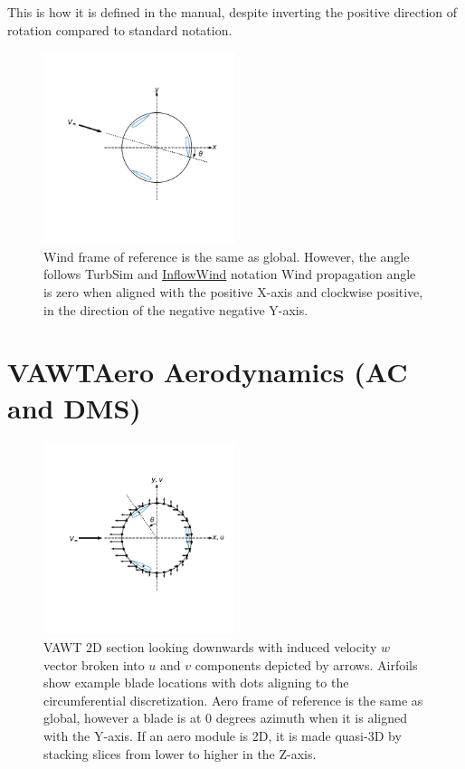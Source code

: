 \documentclass[11pt]{article}
\begin{document}
This is how it is defined in the manual, despite inverting the positive direction of rotation compared to standard notation.

\begin{figure}[H]
\centering
\vspace{-12pt}
\includegraphics[trim={1.3cm 2.4cm .5cm 1.5cm},clip,width=0.5\textwidth]{./figs/inflow_wind}
\vspace{-5pt}
\caption{Wind frame of reference is the same as global.  However, the angle follows TurbSim and \href{https://github.com/old-NWTC/InflowWind}{InflowWind} notation Wind propagation angle is zero when aligned with the positive X-axis and clockwise positive, in the direction of the negative negative Y-axis.}
\label{fig:ac_velocities}
\end{figure}

\section{VAWTAero Aerodynamics (AC and DMS)}

\begin{figure}[H]
\centering
\vspace{-12pt}
\includegraphics[trim={1.3cm 2.4cm .5cm 1.5cm},clip,width=0.5\textwidth]{./figs/vawt_slice}
\vspace{-12pt}
\caption{VAWT 2D section looking downwards with induced velocity \(w\) vector broken into \(u\) and \(v\) components depicted by arrows. Airfoils show example blade locations with dots aligning to the circumferential discretization.  Aero frame of reference is the same as global, however a blade is at 0 degrees azimuth when it is aligned with the Y-axis.  If an aero module is 2D, it is made quasi-3D by stacking slices from lower to higher in the Z-axis.}
\label{fig:ac_velocities}
\end{figure}
\end{document}
